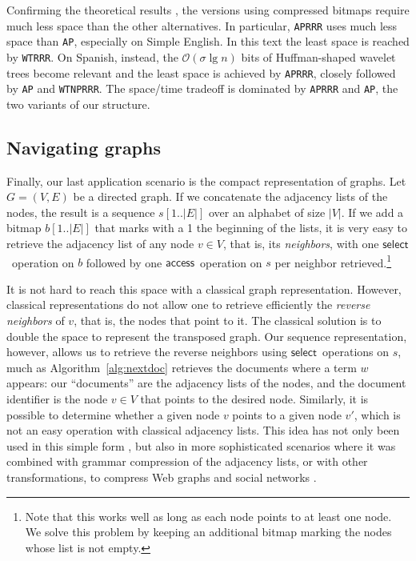 \documentclass[11pt]{article}
\newcommand{\Oh}[1]
    {\ensuremath{\mathcal{O}\left( {#1} \right)}}
\newcommand{\access}
    {\ensuremath{\mathsf{access}}}
\newcommand{\select}
    {\ensuremath{\mathsf{select}}}
\begin{document}
Confirming the theoretical results \cite{MN07impl}, the versions using
compressed bitmaps require much less space than the other alternatives.
In particular, \texttt{APRRR} uses much less space than \texttt{AP}, 
especially on Simple English. In this text the least space is reached by
\texttt{WTRRR}. On Spanish, instead, the $\Oh{\sigma\lg n}$ bits of 
Huffman-shaped wavelet trees become
relevant and the least space is achieved by \texttt{APRRR}, closely followed
by \texttt{AP} and \texttt{WTNPRRR}. The space/time tradeoff is dominated
by \texttt{APRRR} and \texttt{AP}, the two variants of our structure.

\subsection{Navigating graphs}
\label{sec:exp-graph}

Finally, our last application scenario is the compact representation of
graphs. Let $G=(V,E)$ be a directed graph. If we concatenate the adjacency
lists of the nodes, the result is a sequence $s[1..|E|]$ over an alphabet of
size $|V|$. If we add a bitmap $b[1..|E|]$ that marks with a 1 the beginning
of the lists, it is very easy to retrieve the adjacency list of any node $v
\in V$, that is, its {\em neighbors}, with one \select\ operation  on $b$
followed by one \access\ operation on $s$ per neighbor
retrieved.\footnote{Note that this works well as long as each node points to
at least one node. We solve this problem by keeping an additional bitmap
marking the nodes whose list is not empty.}

It is not hard to reach this space with a classical graph representation.
However, classical representations do not allow one to retrieve efficiently the
{\em reverse neighbors} of $v$, that is, the nodes that point to it. The
classical solution is to double the space to represent the transposed graph.
Our sequence representation, however, allows us to retrieve the reverse
neighbors using \select\ operations on $s$, much as
Algorithm~\ref{alg:nextdoc} retrieves the documents where a term $w$ appears:
our ``documents'' are the adjacency lists of the nodes, and the document
identifier is the node $v \in V$ that points to the desired node. Similarly,
it is possible to determine whether a given node $v$ points to a given node
$v'$, which is not an easy operation with classical adjacency lists. This
idea has not only been used in this simple form \cite{CN08}, but also in 
more sophisticated scenarios where it was combined with grammar compression
of the adjacency lists, or with other transformations, to compress Web graphs 
and social networks \cite{CNtweb10,CNlncs10,HN11}.
\end{document}
